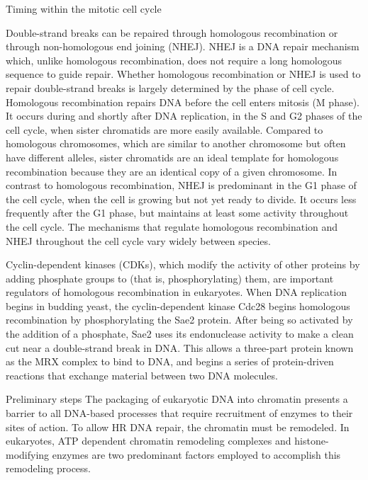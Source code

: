 Timing within the mitotic cell cycle

Double-strand breaks can be repaired through homologous recombination or through non-homologous end joining (NHEJ). NHEJ is a DNA repair mechanism which, unlike homologous recombination, does not require a long homologous sequence to guide repair. Whether homologous recombination or NHEJ is used to repair double-strand breaks is largely determined by the phase of cell cycle. Homologous recombination repairs DNA before the cell enters mitosis (M phase). It occurs during and shortly after DNA replication, in the S and G2 phases of the cell cycle, when sister chromatids are more easily available. Compared to homologous chromosomes, which are similar to another chromosome but often have different alleles, sister chromatids are an ideal template for homologous recombination because they are an identical copy of a given chromosome. In contrast to homologous recombination, NHEJ is predominant in the G1 phase of the cell cycle, when the cell is growing but not yet ready to divide. It occurs less frequently after the G1 phase, but maintains at least some activity throughout the cell cycle. The mechanisms that regulate homologous recombination and NHEJ throughout the cell cycle vary widely between species.

Cyclin-dependent kinases (CDKs), which modify the activity of other proteins by adding phosphate groups to (that is, phosphorylating) them, are important regulators of homologous recombination in eukaryotes. When DNA replication begins in budding yeast, the cyclin-dependent kinase Cdc28 begins homologous recombination by phosphorylating the Sae2 protein. After being so activated by the addition of a phosphate, Sae2 uses its endonuclease activity to make a clean cut near a double-strand break in DNA. This allows a three-part protein known as the MRX complex to bind to DNA, and begins a series of protein-driven reactions that exchange material between two DNA molecules.

Preliminary steps
The packaging of eukaryotic DNA into chromatin presents a barrier to all DNA-based processes that require recruitment of enzymes to their sites of action. To allow HR DNA repair, the chromatin must be remodeled. In eukaryotes, ATP dependent chromatin remodeling complexes and histone-modifying enzymes are two predominant factors employed to accomplish this remodeling process.

